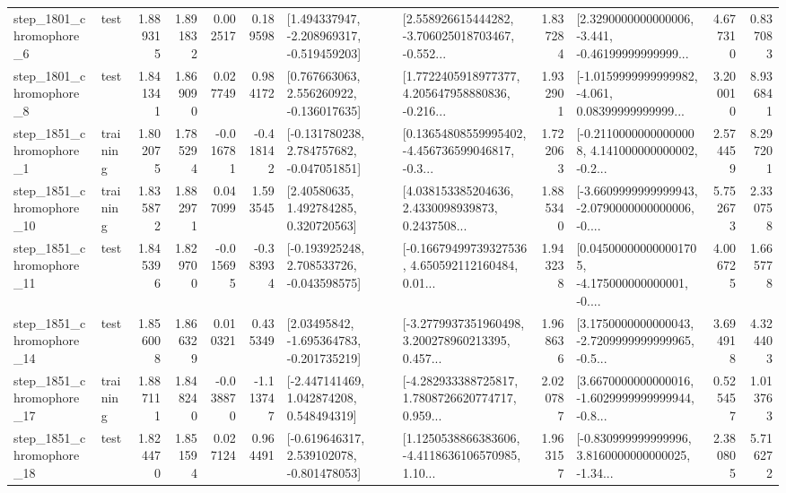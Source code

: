 \begin{tabular}{llrrrrllrlrr}
  step\_1801\_chromophore\_6 &      test &      1.889315 &    1.891832 &      0.002517 &  0.189598 &   [1.494337947, -2.208969317, -0.519459203] &  [2.558926615444282, -3.706025018703467, -0.552... &       1.837284 &  [2.3290000000000006, -3.441, -0.46199999999999... &            4.677310 &          0.837083 \\
  step\_1801\_chromophore\_8 &      test &      1.841341 &    1.869090 &      0.027749 &  0.984172 &    [0.767663063, 2.556260922, -0.136017635] &  [1.7722405918977377, 4.205647958880836, -0.216... &       1.932901 &  [-1.0159999999999982, -4.061, 0.08399999999999... &            3.200010 &          8.936841 \\
  step\_1851\_chromophore\_1 &  training &      1.802075 &    1.785294 &     -0.016781 & -0.418142 &   [-0.131780238, 2.784757682, -0.047051851] &  [0.13654808559995402, -4.456736599046817, -0.3... &       1.722063 &  [-0.21100000000000008, 4.141000000000002, -0.2... &            2.574459 &          8.297201 \\
 step\_1851\_chromophore\_10 &  training &      1.835872 &    1.882971 &      0.047099 &  1.593545 &      [2.40580635, 1.492784285, 0.320720563] &  [4.038153385204636, 2.4330098939873, 0.2437508... &       1.885340 &  [-3.6609999999999943, -2.0790000000000006, -0.... &            5.752673 &          2.330758 \\
 step\_1851\_chromophore\_11 &      test &      1.845396 &    1.829700 &     -0.015695 & -0.383934 &   [-0.193925248, 2.708533726, -0.043598575] &  [-0.16679499739327536, 4.650592112160484, 0.01... &       1.943238 &  [0.045000000000001705, -4.175000000000001, -0.... &            4.006725 &          1.665778 \\
 step\_1851\_chromophore\_14 &      test &      1.856008 &    1.866329 &      0.010321 &  0.435349 &    [2.03495842, -1.695364783, -0.201735219] &  [-3.2779937351960498, 3.200278960213395, 0.457... &       1.968636 &  [3.1750000000000043, -2.7209999999999965, -0.5... &            3.694918 &          4.324403 \\
 step\_1851\_chromophore\_17 &  training &      1.887111 &    1.848240 &     -0.038870 & -1.113747 &    [-2.447141469, 1.042874208, 0.548494319] &  [-4.282933388725817, 1.7808726620774717, 0.959... &       2.020787 &  [3.6670000000000016, -1.6029999999999944, -0.8... &            0.525457 &          1.013763 \\
 step\_1851\_chromophore\_18 &      test &      1.824470 &    1.851594 &      0.027124 &  0.964491 &   [-0.619646317, 2.539102078, -0.801478053] &  [1.1250538866383606, -4.4118636106570985, 1.10... &       1.963157 &  [-0.830999999999996, 3.8160000000000025, -1.34... &            2.380805 &          5.716272 \\

\end{tabular}
